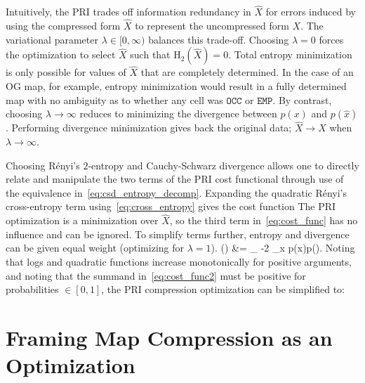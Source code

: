 Intuitively, the PRI trades off information redundancy in $\hat{X}$ for
errors induced by using the compressed form $\hat{X}$ to
represent the uncompressed form $X$. The variational parameter $\lambda \in [0,
 \infty)$ balances this trade-off. Choosing $\lambda=0$ forces the optimization
to select $\hat{X}$ such that $\text{H}_{2}(\hat{X}) = 0$. Total entropy minimization is
only possible for values of $\hat{X}$ that are completely determined. In the case of an
OG map, for example, entropy minimization would result in a fully determined map with no
ambiguity as to whether any cell was $\texttt{OCC}$ or $\texttt{EMP}$. By contrast, choosing $\lambda
\rightarrow \infty$ reduces to minimizing the divergence between $p(x)$ and
$p(\hat{x})$. Performing divergence minimization gives back the original data;
$\hat{X} \rightarrow X$ when $\lambda \rightarrow \infty$.

Choosing R\'{e}nyi's $2$-entropy and Cauchy-Schwarz divergence allows one to
directly relate and manipulate the two terms of the PRI cost functional through
use of  the equivalence in~\eqref{eq:csd_entropy_decomp}.
%
%
Expanding the quadratic R\'{e}nyi's cross-entropy term
using~\eqref{eq:cross_entropy} gives the cost function
%
%
The PRI optimization is a minimization over $\hat{X}$, so the third term
in~\eqref{eq:cost_func} has no influence and can be ignored. To simplify terms
further, entropy and divergence can be given equal weight (optimizing for
$\lambda=1$).
%
\eq
{
  \Lambda()
  &=
  \min_{}
  -2 \lambda \log \sum_{x \in {}}
  p(x)p().
  \label{eq:cost_func2}
}
%
Noting that logs and quadratic functions increase monotonically for positive arguments,
and noting that the summand in~\eqref{eq:cost_func2} must be positive for
probabilities $\in [0, 1]$,
the PRI compression optimization can be simplified to:
%


\section{Framing Map Compression as an Optimization}
\label{sec:pri_framing}

